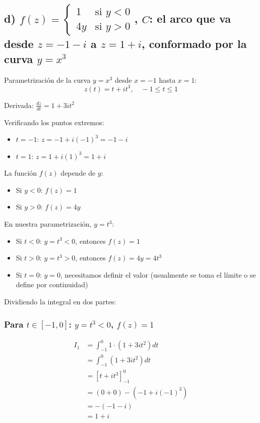 \documentclass{article}
\begin{document}
\subsection*{d) $f(z) = \begin{cases} 1 & \text{si } y < 0 \\ 4y & \text{si } y > 0 \end{cases}$, $C$: el arco que va desde $z = -1 - i$ a $z = 1 + i$, conformado por la curva $y = x^3$}

Parametrización de la curva $y = x^3$ desde $x = -1$ hasta $x = 1$:
$$z(t) = t + it^3, \quad -1 \leq t \leq 1$$

Derivada: $\frac{dz}{dt} = 1 + 3it^2$

Verificando los puntos extremos:
\begin{itemize}
\item $t = -1$: $z = -1 + i(-1)^3 = -1 - i$ \checkmark
\item $t = 1$: $z = 1 + i(1)^3 = 1 + i$ \checkmark
\end{itemize}

La función $f(z)$ depende de $y$:
\begin{itemize}
\item Si $y < 0$: $f(z) = 1$
\item Si $y > 0$: $f(z) = 4y$
\end{itemize}

En nuestra parametrización, $y = t^3$:
\begin{itemize}
\item Si $t < 0$: $y = t^3 < 0$, entonces $f(z) = 1$
\item Si $t > 0$: $y = t^3 > 0$, entonces $f(z) = 4y = 4t^3$
\item Si $t = 0$: $y = 0$, necesitamos definir el valor (usualmente se toma el límite o se define por continuidad)
\end{itemize}

Dividiendo la integral en dos partes:

\subsubsection*{Para $t \in [-1, 0]$: $y = t^3 < 0$, $f(z) = 1$}

\begin{align*}
I_1 &= \int_{-1}^0 1 \cdot (1 + 3it^2) dt \\
    &= \int_{-1}^0 (1 + 3it^2) dt \\
    &= \left[t + it^3\right]_{-1}^0 \\
    &= (0 + 0) - (-1 + i(-1)^3) \\
    &= -(-1 - i) \\
    &= 1 + i
\end{align*}
\end{document}
